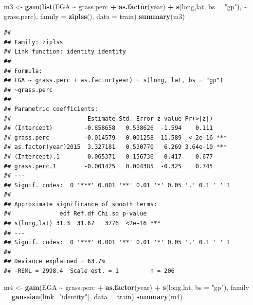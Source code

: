 \documentclass[
]{book}
\newenvironment{Shaded}{\begin{snugshade}}{\end{snugshade}}
\newcommand{\AttributeTok}[1]{\textcolor[rgb]{0.13,0.29,0.53}{#1}}
\newcommand{\FunctionTok}[1]{\textcolor[rgb]{0.13,0.29,0.53}{\textbf{#1}}}
\newcommand{\NormalTok}[1]{#1}
\newcommand{\OtherTok}[1]{\textcolor[rgb]{0.56,0.35,0.01}{#1}}
\newcommand{\SpecialCharTok}[1]{\textcolor[rgb]{0.81,0.36,0.00}{\textbf{#1}}}
\newcommand{\StringTok}[1]{\textcolor[rgb]{0.31,0.60,0.02}{#1}}
\begin{document}
\begin{Shaded}
\begin{Highlighting}[]
\NormalTok{m3 }\OtherTok{\textless{}{-}} \FunctionTok{gam}\NormalTok{(}\FunctionTok{list}\NormalTok{(EGA }\SpecialCharTok{\textasciitilde{}}\NormalTok{ grass.perc }\SpecialCharTok{+} \FunctionTok{as.factor}\NormalTok{(year) }\SpecialCharTok{+} \FunctionTok{s}\NormalTok{(long,lat, }\AttributeTok{bs =} \StringTok{"gp"}\NormalTok{), }\SpecialCharTok{\textasciitilde{}}\NormalTok{ grass.perc), }
          \AttributeTok{family =} \FunctionTok{ziplss}\NormalTok{(), }\AttributeTok{data =}\NormalTok{ train)}
\FunctionTok{summary}\NormalTok{(m3)}
\end{Highlighting}
\end{Shaded}

\begin{verbatim}
## 
## Family: ziplss 
## Link function: identity identity 
## 
## Formula:
## EGA ~ grass.perc + as.factor(year) + s(long, lat, bs = "gp")
## ~grass.perc
## 
## Parametric coefficients:
##                      Estimate Std. Error z value Pr(>|z|)    
## (Intercept)         -0.858658   0.538626  -1.594    0.111    
## grass.perc          -0.014579   0.001258 -11.589  < 2e-16 ***
## as.factor(year)2015  3.327181   0.530770   6.269 3.64e-10 ***
## (Intercept).1        0.065371   0.156736   0.417    0.677    
## grass.perc.1        -0.001425   0.004385  -0.325    0.745    
## ---
## Signif. codes:  0 '***' 0.001 '**' 0.01 '*' 0.05 '.' 0.1 ' ' 1
## 
## Approximate significance of smooth terms:
##              edf Ref.df Chi.sq p-value    
## s(long,lat) 31.3  31.67   3776  <2e-16 ***
## ---
## Signif. codes:  0 '***' 0.001 '**' 0.01 '*' 0.05 '.' 0.1 ' ' 1
## 
## Deviance explained = 63.7%
## -REML = 2998.4  Scale est. = 1         n = 206
\end{verbatim}

\begin{Shaded}
\begin{Highlighting}[]
\NormalTok{m4 }\OtherTok{\textless{}{-}} \FunctionTok{gam}\NormalTok{(EGA }\SpecialCharTok{\textasciitilde{}}\NormalTok{ grass.perc }\SpecialCharTok{+} \FunctionTok{as.factor}\NormalTok{(year) }\SpecialCharTok{+} \FunctionTok{s}\NormalTok{(long,lat, }\AttributeTok{bs =} \StringTok{"gp"}\NormalTok{), }
          \AttributeTok{family =} \FunctionTok{gaussian}\NormalTok{(}\AttributeTok{link=}\StringTok{"identity"}\NormalTok{), }\AttributeTok{data =}\NormalTok{ train)}
\FunctionTok{summary}\NormalTok{(m4)}
\end{Highlighting}
\end{Shaded}
\end{document}
